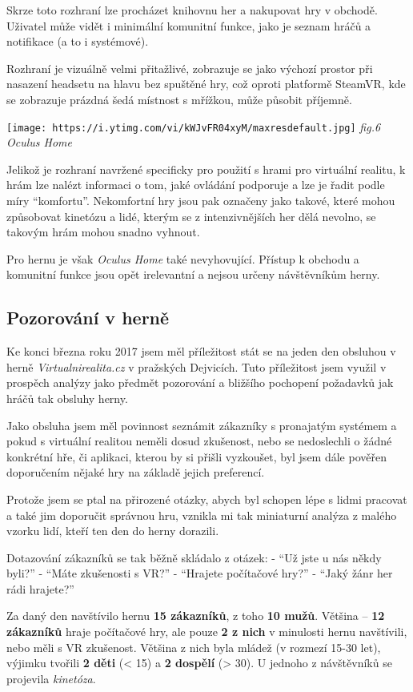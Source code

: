 Skrze toto rozhraní lze procházet knihovnu her a nakupovat hry v
obchodě. Uživatel může vidět i minimální komunitní funkce, jako je
seznam hráčů a notifikace (a to i systémové).

Rozhraní je vizuálně velmi přitažlivé, zobrazuje se jako výchozí prostor
při nasazení headsetu na hlavu bez spuštěné hry, což oproti platformě
SteamVR, kde se zobrazuje prázdná šedá místnost s mřížkou, může působit
příjemně.

\texttt{[image: https://i.ytimg.com/vi/kWJvFR04xyM/maxresdefault.jpg]}
\emph{fig.6 Oculus Home}

Jelikož je rozhraní navržené specificky pro použití s hrami pro
virtuální realitu, k hrám lze nalézt informaci o tom, jaké ovládání
podporuje a lze je řadit podle míry ``komfortu''. Nekomfortní hry jsou
pak označeny jako takové, které mohou způsobovat kinetózu a lidé, kterým
se z intenzivnějších her dělá nevolno, se takovým hrám mohou snadno
vyhnout.

Pro hernu je však \emph{Oculus Home} také nevyhovující. Přístup k
obchodu a komunitní funkce jsou opět irelevantní a nejsou určeny
návštěvníkům herny.

\subsection{Pozorování v herně}\label{pozorovuxe1nuxed-v-hernux11b}

Ke konci března roku 2017 jsem měl příležitost stát se na jeden den
obsluhou v herně \emph{Virtualnirealita.cz} v pražských Dejvicích. Tuto
příležitost jsem využil v prospěch analýzy jako předmět pozorování a
bližšího pochopení požadavků jak hráčů tak obsluhy herny.

Jako obsluha jsem měl povinnost seznámit zákazníky s pronajatým systémem
a pokud s virtuální realitou neměli dosud zkušenost, nebo se nedoslechli
o žádné konkrétní hře, či aplikaci, kterou by si přišli vyzkoušet, byl
jsem dále pověřen doporučením nějaké hry na základě jejich preferencí.

Protože jsem se ptal na přirozené otázky, abych byl schopen lépe s lidmi
pracovat a také jim doporučit správnou hru, vznikla mi tak miniaturní
analýza z malého vzorku lidí, kteří ten den do herny dorazili.

Dotazování zákazníků se tak běžně skládalo z otázek: - ``Už jste u nás
někdy byli?'' - ``Máte zkušenosti s VR?'' - ``Hrajete počítačové hry?''
- ``Jaký žánr her rádi hrajete?''

Za daný den navštívilo hernu \textbf{15 zákazníků}, z toho \textbf{10
mužů}. Většina -- \textbf{12 zákazníků} hraje počítačové hry, ale pouze
\textbf{2 z nich} v minulosti hernu navštívili, nebo měli s VR
zkušenost. Většina z nich byla mládež (v rozmezí 15-30 let), výjimku
tvořili \textbf{2 děti} (\textless{} 15) a \textbf{2 dospělí}
(\textgreater{} 30). U jednoho z návštěvníků se projevila
\emph{kinetóza}.

